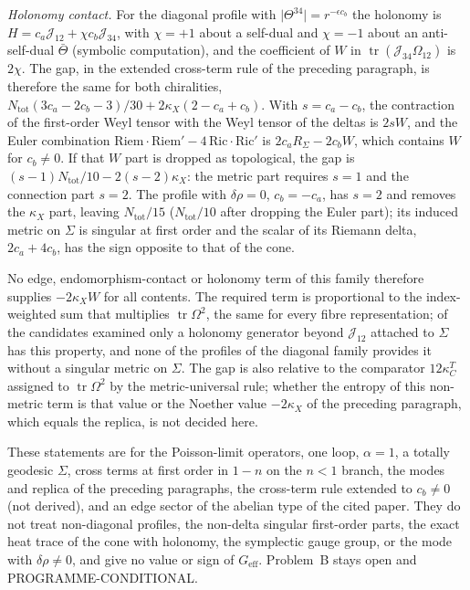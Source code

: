 \emph{Holonomy contact.} For the diagonal profile with \(\lvert\Theta^{34}\rvert=r^{-\epsilon c_b}\) the holonomy is \(H=c_a\mathcal J_{12}+\chi c_b\mathcal J_{34}\), with \(\chi=+1\) about a self-dual and \(\chi=-1\) about an anti-self-dual \(\bar\Theta\) (symbolic computation), and the coefficient of \(W\) in \(\operatorname{tr}(\mathcal J_{34}\Omega_{12})\) is \(2\chi\). The gap, in the extended cross-term rule of the preceding paragraph, is therefore the same for both chiralities, \(N_{\mathrm{tot}}(3c_a-2c_b-3)/30+2\kappa_X(2-c_a+c_b)\). With \(s=c_a-c_b\), the contraction of the first-order Weyl tensor with the Weyl tensor of the deltas is \(2sW\), and the Euler combination \(\mathrm{Riem}\cdot\mathrm{Riem}'-4\,\mathrm{Ric}\cdot\mathrm{Ric}'\) is \(2c_aR_\Sigma-2c_bW\), which contains \(W\) for \(c_b\neq0\). If that \(W\) part is dropped as topological, the gap is \((s-1)N_{\mathrm{tot}}/10-2(s-2)\kappa_X\): the metric part requires \(s=1\) and the connection part \(s=2\). The profile with \(\delta\rho=0\), \(c_b=-c_a\), has \(s=2\) and removes the \(\kappa_X\) part, leaving \(N_{\mathrm{tot}}/15\) (\(N_{\mathrm{tot}}/10\) after dropping the Euler part); its induced metric on \(\Sigma\) is singular at first order and the scalar of its Riemann delta, \(2c_a+4c_b\), has the sign opposite to that of the cone.

No edge, endomorphism-contact or holonomy term of this family therefore supplies \(-2\kappa_X W\) for all contents. The required term is proportional to the index-weighted sum that multiplies \(\operatorname{tr}\Omega^2\), the same for every fibre representation; of the candidates examined only a holonomy generator beyond \(\mathcal J_{12}\) attached to \(\Sigma\) has this property, and none of the profiles of the diagonal family provides it without a singular metric on \(\Sigma\). The gap is also relative to the comparator \(12\kappa_C^T\) assigned to \(\operatorname{tr}\Omega^2\) by the metric-universal rule; whether the entropy of this non-metric term is that value or the Noether value \(-2\kappa_X\) of the preceding paragraph, which equals the replica, is not decided here.

These statements are for the Poisson-limit operators, one loop, \(\alpha=1\), a totally geodesic \(\Sigma\), cross terms at first order in \(1-n\) on the \(n<1\) branch, the modes and replica of the preceding paragraphs, the cross-term rule extended to \(c_b\neq0\) (not derived), and an edge sector of the abelian type of the cited paper. They do not treat non-diagonal profiles, the non-delta singular first-order parts, the exact heat trace of the cone with holonomy, the symplectic gauge group, or the mode with \(\delta\rho\neq0\), and give no value or sign of \(G_{\mathrm{eff}}\). Problem~B stays open and PROGRAMME-CONDITIONAL.

